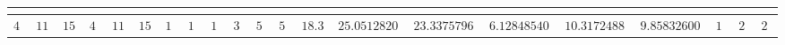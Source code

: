 \begin{table}[!tbp]
\begin{center}
\begin{tabular}{rrrrrrrrrrrrrrrrrrrrr}
\hline\hline
\multicolumn{1}{c}{}&\multicolumn{1}{c}{}&\multicolumn{1}{c}{}&\multicolumn{1}{c}{}&\multicolumn{1}{c}{}&\multicolumn{1}{c}{}&\multicolumn{1}{c}{}&\multicolumn{1}{c}{}&\multicolumn{1}{c}{}&\multicolumn{1}{c}{}&\multicolumn{1}{c}{}&\multicolumn{1}{c}{}&\multicolumn{1}{c}{}&\multicolumn{1}{c}{}&\multicolumn{1}{c}{}&\multicolumn{1}{c}{}&\multicolumn{1}{c}{}&\multicolumn{1}{c}{}&\multicolumn{1}{c}{}&\multicolumn{1}{c}{}&\multicolumn{1}{c}{}\tabularnewline
\hline
$40$&$117$&$157$&$40$&$117$&$157$&$12$&$13$&$12$&$38$&$55$&$55$&$18.325$&$25.0512820512821$&$23.3375796178344$&$6.12848540288164$&$10.3172488262218$&$9.85832600090374$&$16$&$21$&$20$\tabularnewline
\hline
\end{tabular}\end{center}
\end{table}
